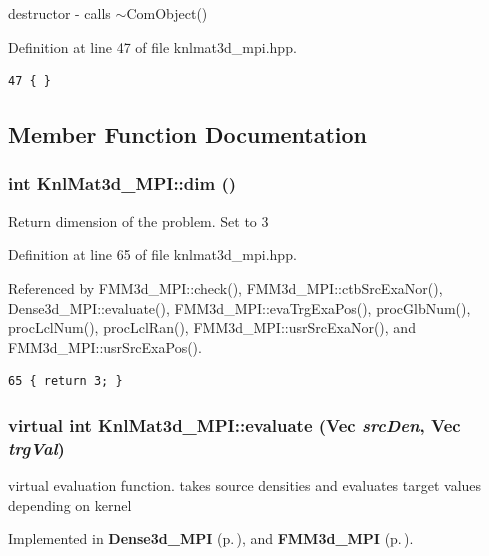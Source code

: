 destructor - calls $\sim$Com\-Object() 

Definition at line 47 of file knlmat3d\_\-mpi.hpp.

\footnotesize\begin{verbatim}47 { }
\end{verbatim}\normalsize 




\subsection{Member Function Documentation}
\subsubsection{\setlength{\rightskip}{0pt plus 5cm}int Knl\-Mat3d\_\-MPI::dim ()\hspace{0.3cm}{\tt  [inline]}}\label{classKnlMat3d__MPI_e3f9953141ca7d7525b58c0ff1ef6b1f_e3f9953141ca7d7525b58c0ff1ef6b1f}


Return dimension of the problem. Set to 3 

Definition at line 65 of file knlmat3d\_\-mpi.hpp.

Referenced by FMM3d\_\-MPI::check(), FMM3d\_\-MPI::ctb\-Src\-Exa\-Nor(), Dense3d\_\-MPI::evaluate(), FMM3d\_\-MPI::eva\-Trg\-Exa\-Pos(), proc\-Glb\-Num(), proc\-Lcl\-Num(), proc\-Lcl\-Ran(), FMM3d\_\-MPI::usr\-Src\-Exa\-Nor(), and FMM3d\_\-MPI::usr\-Src\-Exa\-Pos().

\footnotesize\begin{verbatim}65 { return 3; }
\end{verbatim}\normalsize 


\subsubsection{\setlength{\rightskip}{0pt plus 5cm}virtual int Knl\-Mat3d\_\-MPI::evaluate (Vec {\em src\-Den}, Vec {\em trg\-Val})\hspace{0.3cm}{\tt  [pure virtual]}}\label{classKnlMat3d__MPI_abf7f0a466fbc47db0804a35093c819f_abf7f0a466fbc47db0804a35093c819f}


virtual evaluation function. takes source densities and evaluates target values depending on kernel 

Implemented in {\bf Dense3d\_\-MPI} {\rm (p.\,\pageref{classDense3d__MPI_b6d6d5d529463497e5bed037a921cfc2_b6d6d5d529463497e5bed037a921cfc2})}, and {\bf FMM3d\_\-MPI} {\rm (p.\,\pageref{classFMM3d__MPI_8db45026f69e4b2b504f0c491c170d7d_8db45026f69e4b2b504f0c491c170d7d})}.
